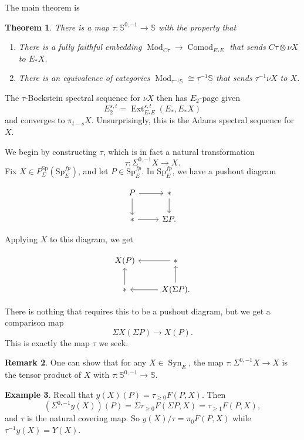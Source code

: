 \documentclass{shortart}
\newtheorem{thm}{Theorem}[section]
\theoremstyle{definition}
\newtheorem{remark}[thm]{Remark}
\newtheorem{eg}[thm]{Example}
\renewcommand\S{{\mathbb{S}}}
\newcommand\Sp{{\mathrm{Sp}}}
\DeclareMathOperator\Ext{Ext}
\DeclareMathOperator\Syn{Syn}
\DeclareMathOperator\Mod{Mod}
\begin{document}
The main theorem is
\begin{thm}
  There is a map $\tau \colon \S^{0, -1} \to \S$ with the property that
  \begin{enumerate}
    \item There is a fully faithful embedding $\Mod_{C\tau} \to \operatorname{Comod}_{E_*E}$ that sends $C\tau \otimes \nu X$ to $E_* X$.
    \item There is an equivalence of categories $\Mod_{\tau^{-1} \S} \cong \tau^{-1} \S$ that sends $\tau^{-1} \nu X$ to $X$.
  \end{enumerate}
\end{thm}
The $\tau$-Bockstein spectral sequence for $\nu X$ then has $E_2$-page given
\[
  E^{s, t}_2 = \Ext_{E_*E}^{s, t}(E_*, E_*X)
\]
and converges to $\pi_{t - s} X$. Unsurprisingly, this is the Adams spectral sequence for $X$.

We begin by constructing $\tau$, which is in fact a natural transformation
\[
  \tau \colon \Sigma^{0, -1} X \to X.
\]
Fix $X \in P_\Sigma^\Sp(\Sp_E^{fp})$, and let $P \in \Sp_E^{fp}$. In $\Sp_E^{fp}$, we have a pushout diagram
\begin{useimager}
\[
  \begin{tikzcd}
    P \ar[r] \ar[d] & * \ar[d] \\
    * \ar[r] & \Sigma P.
  \end{tikzcd}
\]
\end{useimager}
Applying $X$ to this diagram, we get
\begin{useimager}
  \[
    \begin{tikzcd}
      X(P) & * \ar[l] \\
      * \ar[u] & X(\Sigma P). \ar[u] \ar[l]
    \end{tikzcd}
  \]
\end{useimager}
There is nothing that requires this to be a pushout diagram, but we get a comparison map
\[
  \Sigma X(\Sigma P) \to X(P).
\]
This is exactly the map $\tau$ we seek.

\begin{remark}
  One can show that for any $X \in \Syn_E$, the map $\tau \colon \Sigma^{0, -1} X \to X$ is the tensor product of $X$ with $\tau \colon \S^{0, -1} \to \S$.
\end{remark}

\begin{eg}
  Recall that $y(X)(P) = \tau_{\geq 0} F(P, X)$. Then
  \[
    (\Sigma^{0, -1} y(X))(P) = \Sigma \tau_{\geq 0} F(\Sigma P, X) = \tau_{\geq 1} F(P, X),
  \]
  and $\tau$ is the natural covering map. So $y(X) / \tau = \pi_0 F(P, X)$ while $\tau^{-1} y(X) = Y(X)$.
\end{eg}
\end{document}
